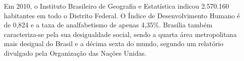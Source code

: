Em 2010, o Instituto Brasileiro de Geografia e Estatística indicou 2.570.160 habitantes em todo o Distrito Federal. O Índice de Desenvolvimento Humano é de 0,824 e a taxa de analfabetismo de apenas 4,35\%. Brasília também caracteriza-se pela sua desigualdade social, sendo a quarta área metropolitana mais desigual do Brasil e a décima sexta do mundo, segundo um relatório divulgado pela Organização das Nações Unidas.
